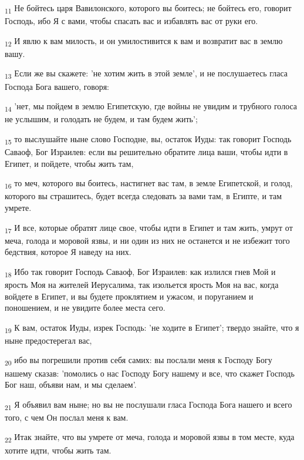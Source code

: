\begin{tcolorbox}
\textsubscript{11} Не бойтесь царя Вавилонского, которого вы боитесь; не бойтесь его, говорит Господь, ибо Я с вами, чтобы спасать вас и избавлять вас от руки его.
\end{tcolorbox}
\begin{tcolorbox}
\textsubscript{12} И явлю к вам милость, и он умилостивится к вам и возвратит вас в землю вашу.
\end{tcolorbox}
\begin{tcolorbox}
\textsubscript{13} Если же вы скажете: 'не хотим жить в этой земле', и не послушаетесь гласа Господа Бога вашего, говоря:
\end{tcolorbox}
\begin{tcolorbox}
\textsubscript{14} 'нет, мы пойдем в землю Египетскую, где войны не увидим и трубного голоса не услышим, и голодать не будем, и там будем жить';
\end{tcolorbox}
\begin{tcolorbox}
\textsubscript{15} то выслушайте ныне слово Господне, вы, остаток Иуды: так говорит Господь Саваоф, Бог Израилев: если вы решительно обратите лица ваши, чтобы идти в Египет, и пойдете, чтобы жить там,
\end{tcolorbox}
\begin{tcolorbox}
\textsubscript{16} то меч, которого вы боитесь, настигнет вас там, в земле Египетской, и голод, которого вы страшитесь, будет всегда следовать за вами там, в Египте, и там умрете.
\end{tcolorbox}
\begin{tcolorbox}
\textsubscript{17} И все, которые обратят лице свое, чтобы идти в Египет и там жить, умрут от меча, голода и моровой язвы, и ни один из них не останется и не избежит того бедствия, которое Я наведу на них.
\end{tcolorbox}
\begin{tcolorbox}
\textsubscript{18} Ибо так говорит Господь Саваоф, Бог Израилев: как излился гнев Мой и ярость Моя на жителей Иерусалима, так изольется ярость Моя на вас, когда войдете в Египет, и вы будете проклятием и ужасом, и поруганием и поношением, и не увидите более места сего.
\end{tcolorbox}
\begin{tcolorbox}
\textsubscript{19} К вам, остаток Иуды, изрек Господь: 'не ходите в Египет'; твердо знайте, что я ныне предостерегал вас,
\end{tcolorbox}
\begin{tcolorbox}
\textsubscript{20} ибо вы погрешили против себя самих: вы послали меня к Господу Богу нашему сказав: 'помолись о нас Господу Богу нашему и все, что скажет Господь Бог наш, объяви нам, и мы сделаем'.
\end{tcolorbox}
\begin{tcolorbox}
\textsubscript{21} Я объявил вам ныне; но вы не послушали гласа Господа Бога нашего и всего того, с чем Он послал меня к вам.
\end{tcolorbox}
\begin{tcolorbox}
\textsubscript{22} Итак знайте, что вы умрете от меча, голода и моровой язвы в том месте, куда хотите идти, чтобы жить там.
\end{tcolorbox}
